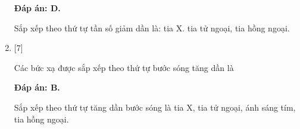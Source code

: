 \begin{enumerate}[label=\bfseries Câu \arabic*:]
	\loigiai
	{		\textbf{Đáp án: D.}
		
		Sắp xếp theo thứ tự tần số giảm dần là: tia X. tia tử ngoại, tia hồng ngoại.
	}
	
	\item {} [7]
	\cauhoi
	{Các bức xạ được sắp xếp theo thứ tự bước sóng tăng dần là
	}
	
	\loigiai
	{		\textbf{Đáp án: B.}
		
		Sắp xếp theo thứ tự tăng dần bước sóng là tia X, tia tử ngoại, ánh sáng tím, tia hồng ngoại.
	}
	
	
\end{enumerate}

